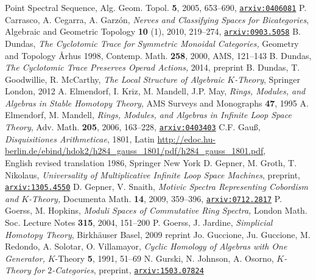 \documentclass[12pt,bibliography=totoc,final]{scrbook} %
\def\arxiv#1{\href{http://arxiv.org/abs/#1}{\texttt{arxiv:#1}}} \def\arxivold#1{\href{http://arxiv.org/abs/math/#1}{\texttt{arxiv:#1}}}
\begin{document}
\begin{thebibliography}{9999999}
{Point Spectral Sequence,} Alg. Geom. Topol. \textbf{5}, 2005, 653--690, \arxivold{0406081}
 P. Carrasco, A. Cegarra, A. Garz\'on, \emph{Nerves and Classifying 
Spaces for Bicategories}, Algebraic and Geometric Topology \textbf{10} 
(1), 2010, 219--274, \arxiv{0903.5058}
 B. Dundas, \emph{The Cyclotomic Trace for Symmetric Monoidal Categories,}
Geometry and Topology \AA rhus 1998, Contemp. Math. \textbf{258}, 2000, AMS, 121--143
 B. Dundas, \emph{The Cyclotomic Trace Preserves Operad Actions,} 2014, preprint
 B. Dundas, T. Goodwillie, R. McCarthy, \emph{The Local Structure of 
Algebraic $K$-Theory}, Springer London, 2012 %
 A. Elmendorf, I. Kriz, M. Mandell, J.P. May, \emph{Rings, Modules,
and Algebras in Stable Homotopy Theory}, AMS Surveys and Monographs \textbf{47}, 1995
 A. Elmendorf, M. Mandell, \emph{Rings, Modules, and Algebras in 
Infinite Loop Space Theory}, Adv. Math. \textbf{205}, 2006, 163--228, \arxivold{0403403}
 C.F. Gau\ss, \emph{Disquisitiones Arithmeticae}, 
1801, Latin \href{http://edoc.hu-berlin.de/ebind/hdok2/h284\_gauss\_1801/pdf/h284\_gauss\_1801.pdf}{
http://edoc.hu-berlin.de/ebind/hdok2/h284\_gauss\_1801/pdf/h284\_gauss\_1801.pdf},\\ English
revised translation 1986, Springer New York 
 D. Gepner, M. Groth, T. Nikolaus, \emph{Universality of Multiplicative
Infinite Loop Space Machines}, preprint, \arxiv{1305.4550}
 D. Gepner, V. Snaith, \emph{Motivic Spectra Representing Cobordism and $K$-Theory,}
Documenta Math. \textbf{14}, 2009, 359--396, \arxiv{0712.2817}
 P. Goerss, M. Hopkins, \emph{Moduli Spaces of Commutative Ring Spectra,}
London Math. Soc. Lecture Notes \textbf{315}, 2004, 151--200
 P. Goerss, J. Jardine, \emph{Simplicial Homotopy Theory}, Birkh{\"a}user Basel, 2009 reprint %
 Jo. Guccione, Ju. Guccione, M. Redondo, A. Solotar, O. Villamayor,
\emph{Cyclic Homology of Algebras with One Generator,} $K$-Theory \textbf{5}, 1991, 51--69
 N. Gurski, N. Johnson, A. Osorno, \emph{$K$-Theory for
$2$-Categories}, preprint, \arxiv{1503.07824}

\end{thebibliography}
\end{document}

